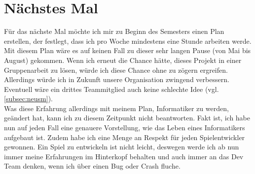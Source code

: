\section{Nächstes Mal}
Für das nächste Mal möchte ich mir zu Beginn des Semesters einen Plan erstellen, der festlegt, dass ich pro Woche mindestens eine Stunde arbeiten werde. Mit diesem Plan wäre es auf keinen Fall zu dieser sehr langen
Pause (von Mai bis August) gekommen. Wenn ich erneut die Chance hätte, dieses Projekt in einer Gruppenarbeit zu lösen, würde ich diese Chance ohne zu zögern ergreifen. Allerdings würde ich in Zukunft
unsere Organisation zwingend verbessern. Eventuell wäre ein drittes Teammitglied auch keine schlechte Idee (vgl. \autoref{subsec:neusm}).\\
Was diese Erfahrung allerdings mit meinem Plan, Informatiker zu werden, geändert hat, kann ich zu diesem Zeitpunkt nicht beantworten. Fakt ist, ich habe nun auf jeden Fall eine genauere Vorstellung,
wie das Leben eines Informatikers aufgebaut ist. Zudem habe ich eine Menge an Respekt für jeden Spielentwickler gewonnen. Ein Spiel zu entwickeln ist nicht leicht, deswegen werde ich ab nun immer meine Erfahrungen im Hinterkopf
behalten und auch immer an das Dev Team denken, wenn ich über einen Bug oder Crash fluche.